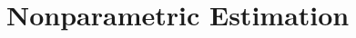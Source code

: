 \setcounter{chapter}{2}

\chapter{Nonparametric Estimation}
\label{chapter:nonparametric.estimation}



